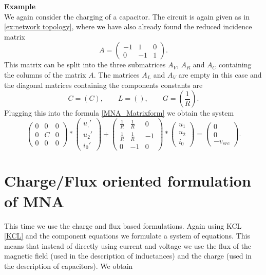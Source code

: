 \textbf{Example} \label{ex:MNA} \\
We again consider the charging of a capacitor. The circuit is again given as in \ref{ex:network topology}, where we have also already found the reduced incidence matrix
\begin{displaymath}
	A = 
	\left(
	\begin{matrix}
		-1 & 1 & 0 \\
		0 & -1 & 1 
	\end{matrix}
	\right).
\end{displaymath} 
 This matrix can be split into the three submatrices $A_V$, $A_R$ and $A_C$ containing the columns of the matrix $A$. The matrices $A_L$ and $A_V$ are empty in this case and the diagonal matrices containing the components constants are
 \begin{displaymath}
 	C = (C), \qquad L = (), \qquad G = (\frac{1}{R}).
 \end{displaymath}
Plugging this into the formula \eqref{MNA_Matrixform} we obtain the system
\begin{displaymath}
	\begin{pmatrix}
		0 & 0 & 0 \\
		0 & C & 0 \\
		0 & 0 & 0
	\end{pmatrix}
	*
	\begin{pmatrix}
		u_,' \\
		u_2' \\
		i_0'
	\end{pmatrix}
	+
	\begin{pmatrix}
		\frac{1}{R} & \frac{1}{R} & 0 \\
		\frac{1}{R} & \frac{1}{R} & -1 \\
		0 & -1 & 0 
	\end{pmatrix}
	*
	\begin{pmatrix}
		u_1 \\
		u_2 \\
		i_0
	\end{pmatrix}
	=
	\begin{pmatrix}
		0 \\
		0 \\
		-v_{src}
	\end{pmatrix}.
\end{displaymath}

\section{Charge/Flux oriented formulation of MNA}
\label{sec:charge flux oriented formulation}
 This time we use the charge and flux based formulations. Again using KCL \eqref{KCL} and the component equations we formulate a system of equations. This means that instead of directly using current and voltage we use the flux of the magnetic field (used in the description of inductances) and the charge (used in the description of capacitors). We obtain

